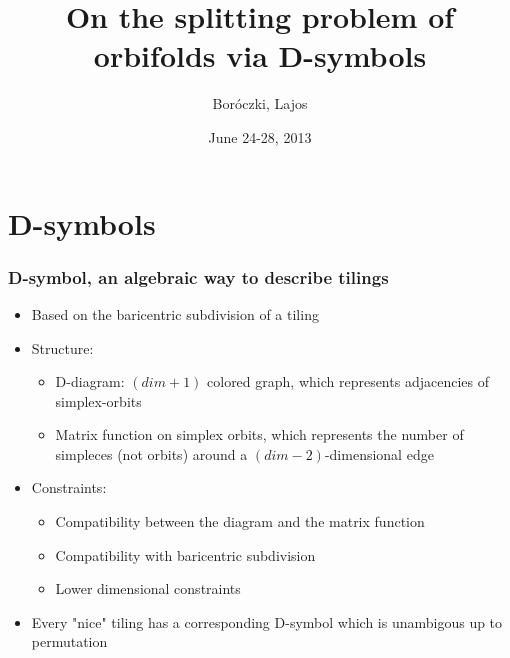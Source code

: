 \usepackage[utf8]{inputenc}
\usepackage{graphicx}
\usepackage{listings}
\usepackage{amsmath}
\usepackage{amssymb}
\usepackage{ae,aecompl}
\usepackage{fix-cm}
\usepackage{hyperref}

\beamertemplatenavigationsymbolsempty
\beamertemplatetextbibitems

\newcommand{\leftexp}[2]{{\vphantom{#2}}^{#1}{#2}}

\title{On the splitting problem of orbifolds via D-symbols}
\author{Boróczki, Lajos}
\date{June 24-28, 2013}



\begin{frame}
  \maketitle
\end{frame}

\begin{frame}
  \tableofcontents
\end{frame}
\newpage

\section{D-symbols}
\begin{frame}
  \frametitle{D-symbol, an algebraic way to describe tilings}
  \begin{itemize}
    \item Based on the baricentric subdivision of a tiling
    \item Structure:
      \begin{itemize}
	\item D-diagram: $(dim+1)$ colored graph, which represents adjacencies of
	  simplex-orbits
	\item Matrix function on simplex orbits, which represents the number of
	  simpleces (not orbits) around a $(dim-2)$-dimensional edge
      \end{itemize}
    \item Constraints:
      \begin{itemize}
	\item Compatibility between the diagram and the matrix function
	\item Compatibility with baricentric subdivision
	\item Lower dimensional constraints
      \end{itemize}
    \item Every "nice" tiling has a corresponding D-symbol which is unambigous
      up to permutation 
  \end{itemize}
\end{frame}

